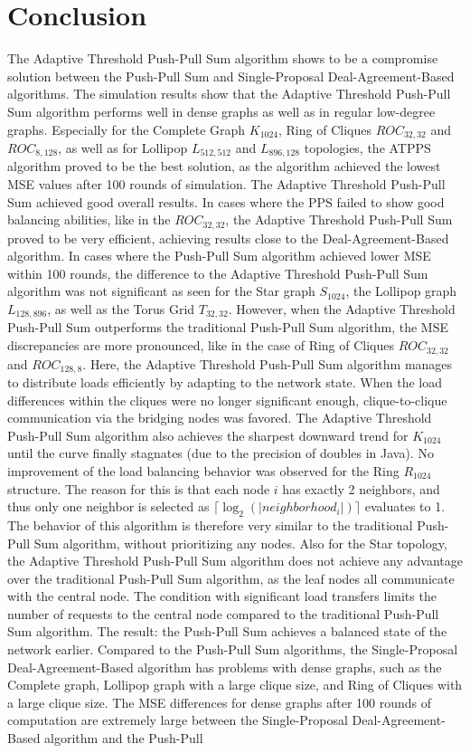 \chapter{Conclusion}\label{chap:conclusion}
The Adaptive Threshold Push-Pull Sum algorithm shows to be a compromise solution between the Push-Pull Sum and Single-Proposal Deal-Agreement-Based algorithms. The simulation results show that the Adaptive Threshold Push-Pull Sum algorithm performs well in dense graphs as well as in regular low-degree graphs. Especially for the Complete Graph $K_{1024}$, Ring of Cliques $ROC_{32,32}$ and $ROC_{8,128}$, as well as for Lollipop $L_{512,512}$ and $L_{896,128}$ topologies, the ATPPS algorithm proved to be the best solution, as the algorithm achieved the lowest MSE values after 100 rounds of simulation. The Adaptive Threshold Push-Pull Sum achieved good overall results. In cases where the PPS failed to show good balancing abilities, like in the $ROC_{32,32}$, the Adaptive Threshold Push-Pull Sum proved to be very efficient, achieving results close to the Deal-Agreement-Based algorithm. In cases where the Push-Pull Sum algorithm achieved lower MSE within 100 rounds, the difference to the Adaptive Threshold Push-Pull Sum algorithm was not significant as seen for the Star graph $S_{1024}$, the Lollipop graph $L_{128,896}$, as well as the Torus Grid $T_{32,32}$. However, when the Adaptive Threshold Push-Pull Sum outperforms the traditional Push-Pull Sum algorithm, the MSE discrepancies are more pronounced, like in the case of Ring of Cliques $ROC_{32,32}$ and $ROC_{128,8}$. Here, the Adaptive Threshold Push-Pull Sum algorithm manages to distribute loads efficiently by adapting to the network state. When the load differences within the cliques were no longer significant enough, clique-to-clique communication via the bridging nodes was favored. The Adaptive Threshold Push-Pull Sum algorithm also achieves the sharpest downward trend for $K_{1024}$ until the curve finally stagnates (due to the precision of doubles in Java). No improvement of the load balancing behavior was observed for the Ring $R_{1024}$ structure. The reason for this is that each node $i$ has exactly 2 neighbors, and thus only one neighbor is selected as $\lceil\log_{2}{(|neighborhood_{i}|)}\rceil$ evaluates to 1. The behavior of this algorithm is therefore very similar to the traditional Push-Pull Sum algorithm, without prioritizing any nodes. Also for the Star topology, the Adaptive Threshold Push-Pull Sum algorithm does not achieve any advantage over the traditional Push-Pull Sum algorithm, as the leaf nodes all communicate with the central node. The condition with significant load transfers limits the number of requests to the central node compared to the traditional Push-Pull Sum algorithm. The result: the Push-Pull Sum achieves a balanced state of the network earlier. Compared to the Push-Pull Sum algorithms, the Single-Proposal Deal-Agreement-Based algorithm has problems with dense graphs, such as the Complete graph, Lollipop graph with a large clique size, and Ring of Cliques with a large clique size. The MSE differences for dense graphs after 100 rounds of computation are extremely large between the Single-Proposal Deal-Agreement-Based algorithm and the Push-Pull 